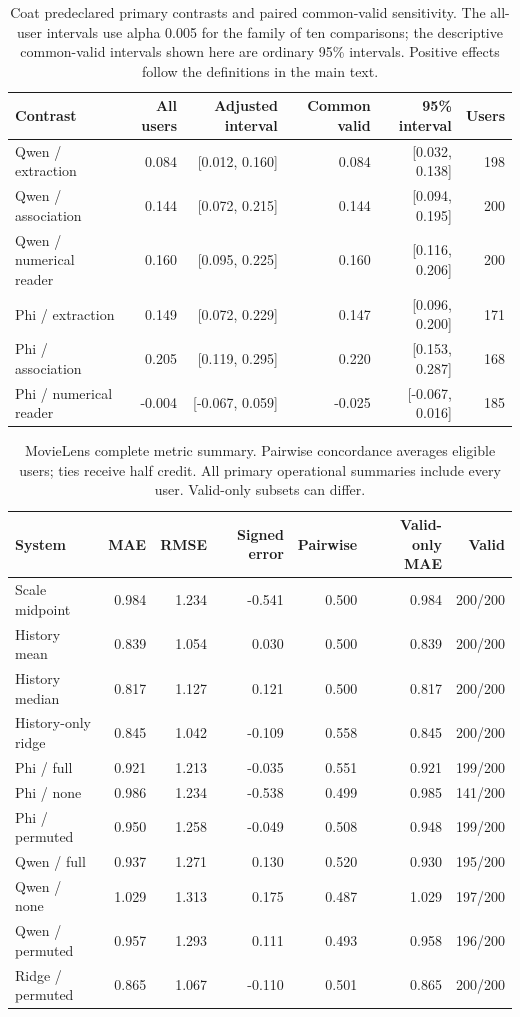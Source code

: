 \begin{table}[t]
\centering\small
\caption{Coat predeclared primary contrasts and paired common-valid sensitivity. The all-user intervals use alpha 0.005 for the family of ten comparisons; the descriptive common-valid intervals shown here are ordinary 95\% intervals. Positive effects follow the definitions in the main text.}
\label{tab:contrasts-coat}
\begin{tabular}{lrrrrr}
\toprule
Contrast & All users & Adjusted interval & Common valid & 95\% interval & Users\\
\midrule
Qwen / extraction & 0.084 & [0.012, 0.160] & 0.084 & [0.032, 0.138] & 198\\
Qwen / association & 0.144 & [0.072, 0.215] & 0.144 & [0.094, 0.195] & 200\\
Qwen / numerical reader & 0.160 & [0.095, 0.225] & 0.160 & [0.116, 0.206] & 200\\
Phi / extraction & 0.149 & [0.072, 0.229] & 0.147 & [0.096, 0.200] & 171\\
Phi / association & 0.205 & [0.119, 0.295] & 0.220 & [0.153, 0.287] & 168\\
Phi / numerical reader & -0.004 & [-0.067, 0.059] & -0.025 & [-0.067, 0.016] & 185\\
\bottomrule
\end{tabular}
\end{table}

\begin{table}[t]
\centering\small
\caption{MovieLens complete metric summary. Pairwise concordance averages eligible users; ties receive half credit. All primary operational summaries include every user. Valid-only subsets can differ.}
\label{tab:metrics-movielens}
\begin{tabular}{lrrrrrr}
\toprule
System & MAE & RMSE & Signed error & Pairwise & Valid-only MAE & Valid\\
\midrule
Scale midpoint & 0.984 & 1.234 & -0.541 & 0.500 & 0.984 & 200/200\\
History mean & 0.839 & 1.054 & 0.030 & 0.500 & 0.839 & 200/200\\
History median & 0.817 & 1.127 & 0.121 & 0.500 & 0.817 & 200/200\\
History-only ridge & 0.845 & 1.042 & -0.109 & 0.558 & 0.845 & 200/200\\
Phi / full & 0.921 & 1.213 & -0.035 & 0.551 & 0.921 & 199/200\\
Phi / none & 0.986 & 1.234 & -0.538 & 0.499 & 0.985 & 141/200\\
Phi / permuted & 0.950 & 1.258 & -0.049 & 0.508 & 0.948 & 199/200\\
Qwen / full & 0.937 & 1.271 & 0.130 & 0.520 & 0.930 & 195/200\\
Qwen / none & 1.029 & 1.313 & 0.175 & 0.487 & 1.029 & 197/200\\
Qwen / permuted & 0.957 & 1.293 & 0.111 & 0.493 & 0.958 & 196/200\\
Ridge / permuted & 0.865 & 1.067 & -0.110 & 0.501 & 0.865 & 200/200\\
\bottomrule
\end{tabular}
\end{table}

